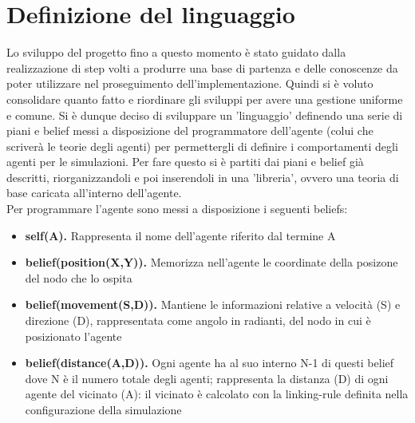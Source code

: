 \documentclass[12pt,a4paper,openright,twoside]{report}
\begin{document}
\section{Definizione del linguaggio}
Lo sviluppo del progetto fino a questo momento \`e stato guidato dalla realizzazione di step volti a produrre una base di partenza e delle conoscenze da poter utilizzare nel proseguimento dell'implementazione.
Quindi si \`e voluto consolidare quanto fatto e riordinare gli sviluppi per avere una gestione uniforme e comune. Si \`e dunque deciso di sviluppare un 'linguaggio' definendo una serie di piani e belief messi a disposizione del programmatore dell'agente (colui che scriver\`a le teorie degli agenti) per permettergli di definire i comportamenti degli agenti per le simulazioni. Per fare questo si \`e partiti dai piani e belief gi\`a descritti, riorganizzandoli e poi inserendoli in una 'libreria', ovvero una teoria di base caricata all'interno dell'agente.
\\
Per programmare l'agente sono messi a disposizione i seguenti beliefs:
\begin{itemize}
   \item \textbf{self(A).} Rappresenta il nome dell'agente riferito dal termine A
   \item \textbf{belief(position(X,Y)).} Memorizza nell'agente le coordinate della posizone del nodo che lo ospita
   \item \textbf{belief(movement(S,D)).} Mantiene le informazioni relative a velocit\`a (S) e direzione (D), rappresentata come angolo in radianti, del nodo in cui \`e posizionato l'agente
   \item \textbf{belief(distance(A,D)).} Ogni agente ha al suo interno N-1 di questi belief dove N \`e il numero totale degli agenti; rappresenta la distanza (D) di ogni agente del vicinato (A): il vicinato \`e calcolato con la linking-rule definita nella configurazione della simulazione
\end{itemize}
\end{document}

